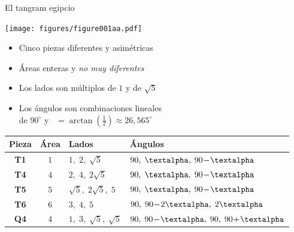 \documentclass[14pt,aspectratio=169,usenames,dvipsnames]{beamer}
\begin{document}

    \begin{frame}{El tangram egipcio}
        \begin{center}

            \begin{minipage}{15.5ex}\vspace{1ex}
                \texttt{[image: figures/figure001aa.pdf]}\\
            \end{minipage}\begin{minipage}{32ex}
                \footnotesize\vspace{-1ex}
                \begin{itemize}
                    \item Cinco piezas diferentes y asimétricas
                    \item Áreas enteras y \emph{no muy diferentes}
                    \item Los lados son múltiplos de $1$ y de $\sqrt{5}$
                    \item Los ángulos son combinaciones lineales\\de $90^\circ$ y \textalpha\ $= \arctan{\!\left(\tfrac{1}{2}\right)} \approx 26,565^\circ$
                \end{itemize}
            \end{minipage}

            \smallskip

            {\footnotesize
            \begin{tabular}{c|c|l|l}
                \;\;\textbf{Pieza}\;\; & \;\;\textbf{Área}\;\; & \;\;\textbf{Lados} & \;\;\textbf{Ángulos} \\ \hline
                \textbf{T1} & $1$ & \;\;$1,\; 2,\; \sqrt{5}$          & \;\;$90,\; \text{\textalpha},\; 90\!-\!\text{\textalpha}$   \\ \hline
                \textbf{T4} & $4$ & \;\;$2,\; 4,\; 2\sqrt{5}$         & \;\;$90,\; \text{\textalpha},\; 90\!-\!\text{\textalpha}$   \\ \hline
                \textbf{T5} & $5$ & \;\;$\sqrt{5},\; 2\sqrt{5},\; 5$  & \;\;$90,\; \text{\textalpha},\; 90\!-\!\text{\textalpha}$   \\ \hline
                \textbf{T6} & $6$ & \;\;$3,\; 4,\; 5$                 & \;\;$90,\; 90\!-\!2\text{\textalpha},\; 2\text{\textalpha}$ \\ \hline
                \textbf{Q4} & $4$ & \;\;$1,\; 3,\; \sqrt{5},\; \sqrt{5}$\;\; & \;\;$90,\; 90\!-\!\text{\textalpha},\; 90,\; 90\!+\!\text{\textalpha}$\;\;
            \end{tabular}}
        \end{center}
    \end{frame}
\end{document}
